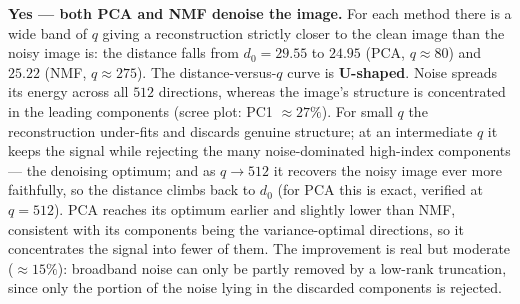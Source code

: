 \documentclass[10pt,a4paper]{article}
\begin{document}
\textbf{Yes --- both PCA and NMF denoise the image.} For each method there is a wide band of $q$ giving a reconstruction strictly closer to the clean image than the noisy image is: the distance falls from $d_0=29.55$ to $24.95$ (PCA, $q\approx80$) and $25.22$ (NMF, $q\approx275$). The distance-versus-$q$ curve is \textbf{U-shaped}. Noise spreads its energy across all $512$ directions, whereas the image's structure is concentrated in the leading components (scree plot: PC1 $\approx27\%$). For small $q$ the reconstruction under-fits and discards genuine structure; at an intermediate $q$ it keeps the signal while rejecting the many noise-dominated high-index components --- the denoising optimum; and as $q\to512$ it recovers the noisy image ever more faithfully, so the distance climbs back to $d_0$ (for PCA this is exact, verified at $q=512$). PCA reaches its optimum earlier and slightly lower than NMF, consistent with its components being the variance-optimal directions, so it concentrates the signal into fewer of them. The improvement is real but moderate ($\approx15\%$): broadband noise can only be partly removed by a low-rank truncation, since only the portion of the noise lying in the discarded components is rejected.
\end{document}
